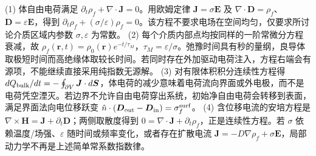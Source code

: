 (1) 体自由电荷满足 \(\partial_t\rho_f+\nabla\cdot\boldsymbol J=0\)。用欧姆定律 \(\boldsymbol J=\sigma\boldsymbol E\) 及 \(\nabla\cdot\boldsymbol D=\rho_f\)、\(\boldsymbol D=\varepsilon\boldsymbol E\)，得到 \(\partial_t\rho_f+(\sigma/\varepsilon)\rho_f=0\)。该方程不要求电场在空间均匀，仅要求所讨论介质区域内参数 \(\sigma,\varepsilon\) 为常数。
(2) 每个介质内部点均按同样的一阶常微分方程衰减，故 \(\rho_f(\boldsymbol r,t)=\rho_0(\boldsymbol r)e^{-t/\tau_M}\)，\(\tau_M=\varepsilon/\sigma\)。弛豫时间具有秒的量纲，良导体取极短时间而高绝缘体取较长时间。若同时存在外加驱动电荷注入，方程右端会有源项，不能继续直接采用纯指数无源解。
(3) 对有限体积积分连续性方程得 \(dQ_{\rm bulk}/dt=-\oint_{\partial V}\boldsymbol J\cdot d\boldsymbol S\)，体电荷的减少意味着电荷流向界面或外电极，而不是电荷凭空湮灭。若边界不允许自由电荷穿出系统，初始净自由电荷会转移到表面，满足界面法向电位移跃变 \(\hat n\cdot(\boldsymbol D_{\rm out}-\boldsymbol D_{\rm in})=\sigma_f^{\rm surf}\)。
(4) 含位移电流的安培方程是 \(\nabla\times\boldsymbol H=\boldsymbol J+\partial_t\boldsymbol D\)；两侧取散度得到 \(0=\nabla\cdot\boldsymbol J+\partial_t\rho_f\)，正是连续性方程。若 \(\sigma\) 依赖温度/场强、\(\varepsilon\) 随时间或频率变化，或者存在扩散电流 \(\boldsymbol J=-D\nabla\rho_f+\sigma\boldsymbol E\)，局部动力学不再是上述简单常系数指数律。

